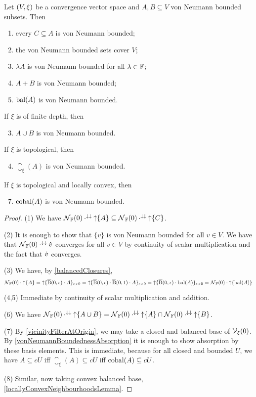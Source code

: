 \begin{lemma} \label{vonNeumannBoundedSetLemma}
Let $\sSet{V,\xi}$ be a convergence vector space and $A,B\subseteq V$ von Neumann bounded subsets. Then
\begin{enumerate}
\item every $C\subseteq A$ is von Neumann bounded;
\item the von Neumann bounded sets cover $V$;
\item $\lambda A$ is von Neumann bounded for all $\lambda\in\mathbb{F}$;
\item $A+B$ is von Neumann bounded;
\item $\operatorname{bal}(A)$ is von Neumann bounded.
\end{enumerate}
If $\xi$ is of finite depth, then
\begin{enumerate} \setcounter{enumi}{2}
\item $A\cup B$ is von Neumann bounded.
\end{enumerate}
If $\xi$ is topological, then
\begin{enumerate} \setcounter{enumi}{3}
\item $\closure_\xi(A)$ is von Neumann bounded.
\end{enumerate}
If $\xi$ is topological and locally convex, then
\begin{enumerate}\setcounter{enumi}{6}
\item $\operatorname{cobal}(A)$ is von Neumann bounded.
\end{enumerate}
\end{lemma}
\begin{proof}
(1) We have $\operatorname{\mathcal{N}}_{\mathbb{F}}(0) \cdot^{\downarrow\downarrow} \operatorname{\uparrow}\{A\} \subseteq \operatorname{\mathcal{N}}_{\mathbb{F}}(0) \cdot^{\downarrow\downarrow} \operatorname{\uparrow}\{C\}$.

(2) It is enough to show that $\{v\}$ is von Neumann bounded for all $v\in V$. We have that $\operatorname{\mathcal{N}}_{\mathbb{F}}(0) \cdot^{\downarrow\downarrow} \dot{v}$ converges for all $v\in V$ by continuity of scalar multiplication and the fact that $\dot{v}$ converges. 

(3) We have, by \ref{balancedClosures},
\[ \operatorname{\mathcal{N}}_{\mathbb{F}}(0) \cdot \operatorname{\uparrow}\{A\} = \operatorname{\uparrow} \{\operatorname{\overline{B}}(0,\epsilon) \cdot A\}_{\epsilon >0} = \operatorname{\uparrow} \{\operatorname{\overline{B}}(0,\epsilon)\cdot \operatorname{\overline{B}}(0,1) \cdot A\}_{\epsilon >0} = \operatorname{\uparrow} \{\operatorname{\overline{B}}(0,\epsilon)\cdot \operatorname{bal}(A)\}_{\epsilon >0} = \operatorname{\mathcal{N}}_{\mathbb{F}}(0) \cdot \operatorname{\uparrow}\{\operatorname{bal}(A)\} \]

(4,5) Immediate by continuity of scalar multiplication and addition.

(6) We have $\operatorname{\mathcal{N}}_{\mathbb{F}}(0)\cdot^{\downarrow\downarrow}\operatorname{\uparrow}\{A\cup B\} = \operatorname{\mathcal{N}}_{\mathbb{F}}(0)\cdot^{\downarrow\downarrow}\operatorname{\uparrow}\{A\} \cap \operatorname{\mathcal{N}}_{\mathbb{F}}(0)\cdot^{\downarrow\downarrow}\operatorname{\uparrow}\{B\}$.

(7) By \ref{vicinityFilterAtOrigin}, we may take a closed and balanced base of $\operatorname{\mathcal{V}}_{\xi}(0)$.  
By \ref{vonNeumannBoundednessAbsorption} it is enough to show absorption by these basis elements. This is immediate, because for all closed and bounded $U$, we have $A\subseteq cU$ iff $\closure_\xi(A) \subseteq cU$ iff $\operatorname{cobal}(A) \subseteq cU$.

(8) Similar, now taking convex balanced base, \ref{locallyConvexNeighbourhoodsLemma}.
\end{proof}
